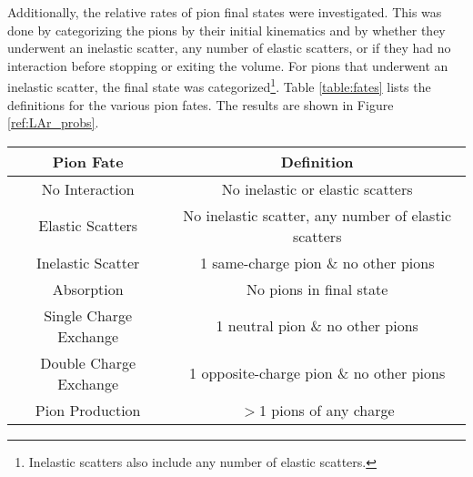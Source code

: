 \documentclass[12pt]{article}
\begin{document}
Additionally, the relative rates of pion final states were investigated. This was done by categorizing the pions by their initial kinematics and by whether they underwent an inelastic scatter, any number of elastic scatters, or if they had no interaction before stopping or exiting the volume. For pions that underwent an inelastic scatter, the final state was categorized\footnote{Inelastic scatters also include any number of elastic scatters.}. Table \ref{table:fates} lists the definitions for the various pion fates. The results are shown in Figure \ref{ref:LAr_probs}. %
\begin{center}\label{table:fates}
  \begin{tabular}{| c | c |}
  \hline
  Pion Fate & Definition  \\
  \hline
  No Interaction & No inelastic or elastic scatters \\ 
  \hline
  Elastic Scatters & No inelastic scatter, any number of elastic scatters \\
  \hline	
  Inelastic Scatter & 1 same-charge pion \& no other pions \\
  \hline  
  Absorption & No pions in final state \\
  \hline
  Single Charge Exchange & 1 neutral pion \& no other pions \\
  \hline
  Double Charge Exchange & 1 opposite-charge pion \& no other pions \\
  \hline
  Pion Production & $>$1 pions of any charge \\
  \hline
  \end{tabular}
\end{center}
\newpage

\end{document}
